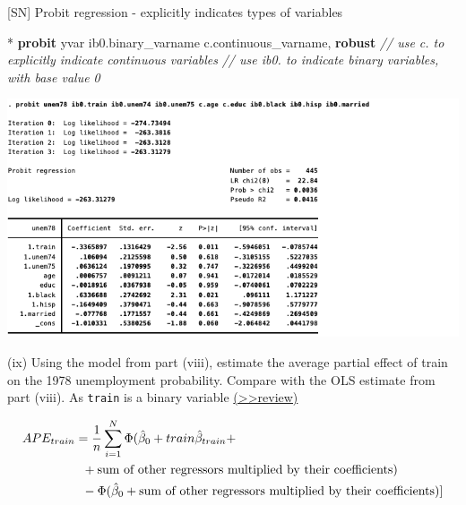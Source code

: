 \documentclass[
  10pt,
  ignorenonframetext,
]{beamer}
\newenvironment{Shaded}{\begin{snugshade}}{\end{snugshade}}
\newcommand{\CommentTok}[1]{\textcolor[rgb]{0.56,0.35,0.01}{\textit{#1}}}
\newcommand{\KeywordTok}[1]{\textcolor[rgb]{0.13,0.29,0.53}{\textbf{#1}}}
\newcommand{\NormalTok}[1]{#1}
\begin{document}
\begin{frame}[fragile]{{[}SN{]} Probit regression - explicitly indicates
types of variables}
\protect\hypertarget{sn-probit-regression---explicitly-indicates-types-of-variables}{}
\footnotesize

\begin{Shaded}
\begin{Highlighting}[]
\NormalTok{* }\KeywordTok{probit}\NormalTok{ yvar ib0.binary\_varname c.continuous\_varname, }\KeywordTok{robust}
\CommentTok{// use \textquotesingle{}c.\textquotesingle{} to explicitly indicate continuous variables}
\CommentTok{// use \textquotesingle{}ib0.\textquotesingle{} to indicate binary variables, with base value 0}
\end{Highlighting}
\end{Shaded}

\begin{center}\includegraphics[width=1\linewidth]{pictures/PROBITfullform} \end{center}
\end{frame}

\begin{frame}[fragile]{(ix) Using the model from part (viii), estimate
the average partial effect of train on the 1978 unemployment
probability. Compare with the OLS estimate from part (viii).}
\protect\hypertarget{Ex1-ix}{}
As \texttt{train} is a binary variable
\footnotesize \protect\hyperlink{APEcalculation}{(\textgreater\textgreater review)}
\small

\[
\begin{aligned}
APE_{train} &= \frac{1}{n} \sum_{i=1}^{N} \Phi (\hat{\beta}_0 + train \hat\beta_{train} + \\
&\hspace{2mm}+  \text{sum of other regressors multiplied by their coefficients}) \\
&\hspace{2mm}- \Phi (\hat{\beta}_0 +  \text{sum of other regressors multiplied by their coefficients} ) ]
\end{aligned}
\]
\end{frame}
\end{document}
